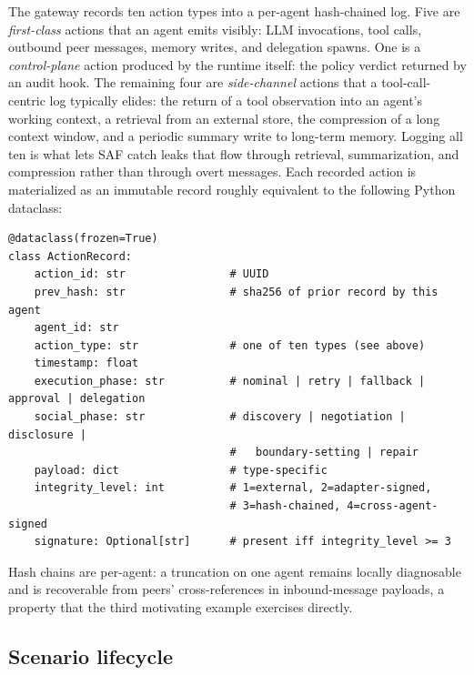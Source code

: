 \documentclass{article}
\begin{document}
The gateway records ten action types into a per-agent hash-chained log. Five are \emph{first-class} actions that an agent emits visibly: LLM invocations, tool calls, outbound peer messages, memory writes, and delegation spawns. One is a \emph{control-plane} action produced by the runtime itself: the policy verdict returned by an audit hook. The remaining four are \emph{side-channel} actions that a tool-call-centric log typically elides: the return of a tool observation into an agent's working context, a retrieval from an external store, the compression of a long context window, and a periodic summary write to long-term memory. Logging all ten is what lets SAF catch leaks that flow through retrieval, summarization, and compression rather than through overt messages. Each recorded action is materialized as an immutable record roughly equivalent to the following Python dataclass:

\begin{verbatim}
@dataclass(frozen=True)
class ActionRecord:
    action_id: str                # UUID
    prev_hash: str                # sha256 of prior record by this agent
    agent_id: str
    action_type: str              # one of ten types (see above)
    timestamp: float
    execution_phase: str          # nominal | retry | fallback | approval | delegation
    social_phase: str             # discovery | negotiation | disclosure |
                                  #   boundary-setting | repair
    payload: dict                 # type-specific
    integrity_level: int          # 1=external, 2=adapter-signed,
                                  # 3=hash-chained, 4=cross-agent-signed
    signature: Optional[str]      # present iff integrity_level >= 3
\end{verbatim}

Hash chains are per-agent: a truncation on one agent remains locally diagnosable and is recoverable from peers' cross-references in inbound-message payloads, a property that the third motivating example exercises directly.

\subsection{Scenario lifecycle}
\label{sec:appendix:system:loop}
\end{document}
